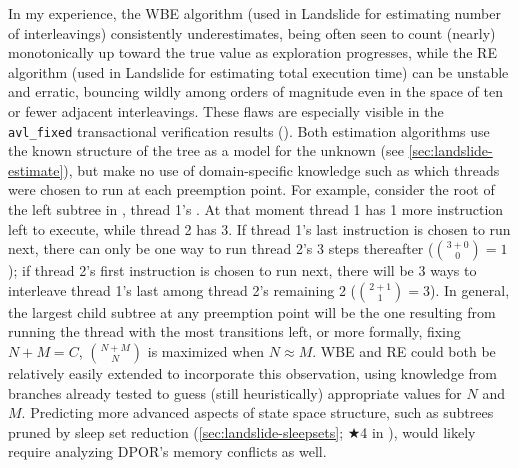In my experience,
the WBE algorithm (used in Landslide for estimating number of interleavings) consistently underestimates,
being often seen to count (nearly) monotonically up toward the true value as exploration progresses,
while the RE algorithm (used in Landslide for estimating total execution time) can be unstable and erratic,
bouncing wildly among orders of magnitude even in the space of ten or fewer adjacent interleavings.
These flaws are especially visible in the {\tt avl\_fixed} transactional verification results ().
Both estimation algorithms
use the known structure of the tree as a model for the unknown
(see \cref{sec:landslide-estimate}),
but make no use of domain-specific knowledge such as which threads were chosen to run at each preemption point.
For example, consider the root of the left subtree in ,
thread 1's .
At that moment thread 1 has 1 more instruction left to execute, while thread 2 has 3.
If thread 1's last instruction is chosen to run next,
there can only be one way to run thread 2's 3 steps thereafter (${3+0 \choose 0} = 1$);
if thread 2's first instruction is chosen to run next,
there will be 3 ways to interleave thread 1's last among thread 2's remaining 2 (${2+1 \choose 1} = 3$).
In general, the largest child subtree at any preemption point will be the one resulting from running the thread with the most transitions left,
or more formally, fixing $N+M=C$, ${N+M \choose N}$ is maximized when $N \approx M$.
WBE and RE could both be relatively easily extended to incorporate this observation,
using knowledge from branches already tested to guess (still heuristically) appropriate values for $N$ and $M$.
Predicting more advanced aspects of state space structure,
such as subtrees pruned by sleep set reduction
(\cref{sec:landslide-sleepsets}; $\bigstar$4 in ),
would likely require analyzing DPOR's memory conflicts as well.

